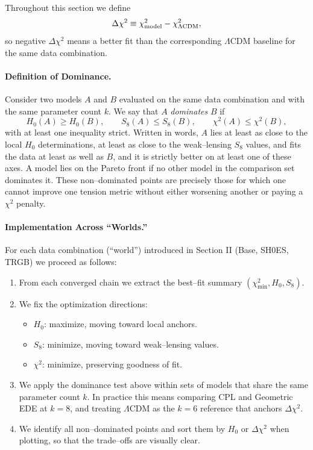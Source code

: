 \documentclass[a4paper,11pt]{article}
\begin{document}
Throughout this section we define
\begin{equation}
\Delta\chi^2 \equiv \chi^2_{\rm model} - \chi^2_{\Lambda{\rm CDM}},
\end{equation}
so negative $\Delta\chi^2$ means a better fit than the corresponding $\Lambda$CDM baseline for the same data combination.

\paragraph{Definition of Dominance.}
Consider two models $A$ and $B$ evaluated on the same data combination and with the same parameter count $k$. We say that $A$ \emph{dominates} $B$ if
\begin{equation}
H_0(A) \ge H_0(B), \qquad S_8(A) \le S_8(B), \qquad \chi^2(A) \le \chi^2(B),
\end{equation}
with at least one inequality strict. Written in words, $A$ lies at least as close to the local $H_0$ determinations, at least as close to the weak--lensing $S_8$ values, and fits the data at least as well as $B$, and it is strictly better on at least one of these axes. A model lies on the Pareto front if no other model in the comparison set dominates it. These non--dominated points are precisely those for which one cannot improve one tension metric without either worsening another or paying a $\chi^2$ penalty.

\paragraph{Implementation Across ``Worlds.''}
For each data combination (``world'') introduced in Section II (Base, SH0ES, TRGB) we proceed as follows:
\begin{enumerate}
    \item From each converged chain we extract the best--fit summary $(\chi^2_{\min}, H_0, S_8)$.
    \item We fix the optimization directions:
    \begin{itemize}
        \item $H_0$: maximize, moving toward local anchors.
        \item $S_8$: minimize, moving toward weak--lensing values.
        \item $\chi^2$: minimize, preserving goodness of fit.
    \end{itemize}
    \item We apply the dominance test above within sets of models that share the same parameter count $k$. In practice this means comparing CPL and Geometric EDE at $k = 8$, and treating $\Lambda$CDM as the $k = 6$ reference that anchors $\Delta\chi^2$.
    \item We identify all non--dominated points and sort them by $H_0$ or $\Delta\chi^2$ when plotting, so that the trade--offs are visually clear.
\end{enumerate}
\end{document}
